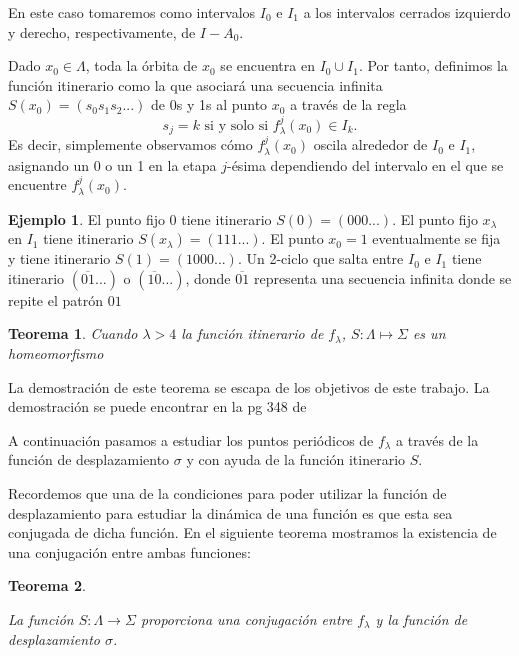 \documentclass[12pt,a4paper]{report}
\newtheorem{teorema}{Teorema}[section]
\theoremstyle{definition}
\newtheorem{ejemplo}{Ejemplo}[section]
\begin{document}
En este caso tomaremos como intervalos \(I_{0}\) e \(I_{1}\) a los intervalos cerrados izquierdo y derecho, respectivamente, de \(I-A_0\). 

Dado \(x_{0}\in\Lambda\), toda la órbita de \(x_{0}\) se encuentra en \(I_{0}\cup I_{1}\). Por tanto, definimos la función itinerario como la que asociará una secuencia infinita \(S(x_{0})=(s_{0}s_{1}s_{2}...)\) de 0s y 1s al punto \(x_{0}\) a través de la regla
\[
s_{j}=k \text{ si y solo si } f_{\lambda}^{j}(x_{0})\in I_{k}.
\]
%
Es decir, simplemente observamos cómo \(f_{\lambda}^{j}(x_{0})\) oscila alrededor de \(I_{0}\) e \(I_{1}\), asignando un 0 o un 1 en la etapa \(j\)-ésima dependiendo del intervalo en el que se encuentre \(f_{\lambda}^{j}(x_{0})\).

\begin{ejemplo}
    
El punto fijo 0 tiene itinerario \(S(0)=(000...)\). El punto fijo \(x_{\lambda}\) en \(I_{1}\) tiene itinerario \(S(x_{\lambda})=(111...)\). El punto \(x_{0}=1\) eventualmente se fija y tiene itinerario \(S(1)=(1000...)\). Un 2-ciclo que salta entre \(I_{0}\) e \(I_{1}\) tiene itinerario \((\overline{01}...)\) o \((\overline{10}...)\), donde \(\overline{01}\) representa una secuencia infinita donde se repite el patrón $01$

\end{ejemplo}

\begin{teorema}

Cuando $\lambda > 4$ la función itinerario de $f_{\lambda}$,  $S : \Lambda \mapsto \Sigma$ es un homeomorfismo

\end{teorema}


La demostración de este teorema se escapa de los objetivos de este trabajo. La demostración se puede encontrar en la pg 348 de \cite{ref1}

A continuación pasamos a estudiar los puntos periódicos de $f_{\lambda}$ a través de la función de desplazamiento $\sigma$ y con ayuda de la función itinerario $S$.

Recordemos que una de la condiciones para poder utilizar la función de desplazamiento para estudiar la dinámica de una función es que esta sea conjugada de dicha función. En el siguiente teorema mostramos la existencia de una conjugación entre ambas funciones: 

\begin{teorema}\label{Te3.3.3}

La función  \(S:\Lambda\rightarrow\Sigma\) proporciona una conjugación entre \(f_{\lambda}\) y la función de desplazamiento \(\sigma\).

\end{teorema}
\end{document}
